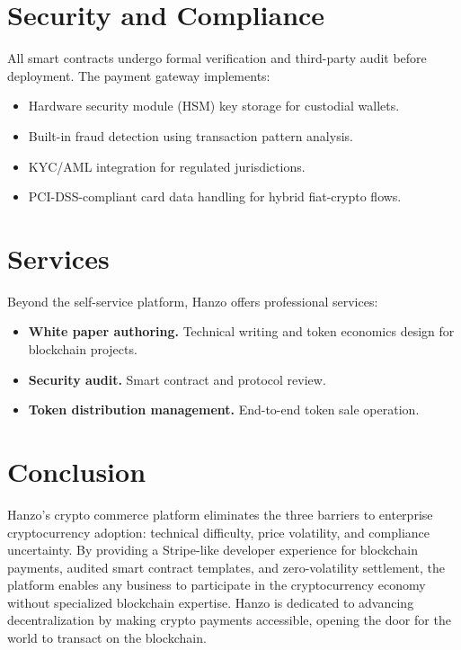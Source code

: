 \documentclass[11pt,twocolumn]{article}
\begin{document}
\section{Security and Compliance}
\label{sec:security}

All smart contracts undergo formal verification and third-party audit before
deployment. The payment gateway implements:

\begin{itemize}[leftmargin=1.1em]
    \item Hardware security module (HSM) key storage for custodial wallets.
    \item Built-in fraud detection using transaction pattern analysis.
    \item KYC/AML integration for regulated jurisdictions.
    \item PCI-DSS-compliant card data handling for hybrid fiat-crypto flows.
\end{itemize}

\section{Services}
\label{sec:services}

Beyond the self-service platform, Hanzo offers professional services:

\begin{itemize}[leftmargin=1.1em]
    \item \textbf{White paper authoring.} Technical writing and token economics
    design for blockchain projects.
    \item \textbf{Security audit.} Smart contract and protocol review.
    \item \textbf{Token distribution management.} End-to-end token sale
    operation.
\end{itemize}

\section{Conclusion}
\label{sec:conclusion}

Hanzo's crypto commerce platform eliminates the three barriers to enterprise
cryptocurrency adoption: technical difficulty, price volatility, and
compliance uncertainty. By providing a Stripe-like developer experience for
blockchain payments, audited smart contract templates, and zero-volatility
settlement, the platform enables any business to participate in the
cryptocurrency economy without specialized blockchain expertise. Hanzo is
dedicated to advancing decentralization by making crypto payments accessible,
opening the door for the world to transact on the blockchain.
\end{document}
